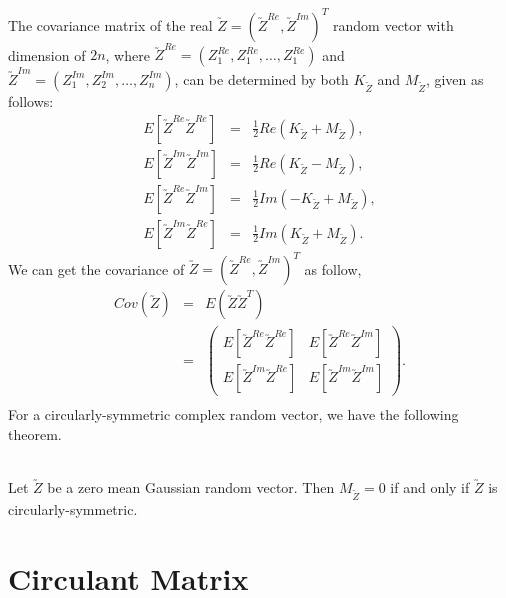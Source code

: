 The covariance matrix of the real $\utilde{Z}=(\utilde{Z}^{Re}, \utilde{Z}^{Im})^T$ random vector with dimension of $2n$, where $\utilde{Z}^{Re} = (Z_1^{Re}, Z_1^{Re}, \ldots, Z_1^{Re})$ and $\utilde{Z}^{Im} =
(Z_1^{Im}, Z_2^{Im}, \ldots, Z_n^{Im})$, can be determined by both $K_{\utilde{Z}}$ and $M_{\utilde{Z}}$, given as follows:
\begin{eqnarray}
	E[\utilde{Z}^{Re}\utilde{Z}^{Re}] &=& \frac{1}{2}Re(K_{\utilde{Z}} + M_{\utilde{Z}}), \nonumber\\
	E[\utilde{Z}^{Im}\utilde{Z}^{Im}] &=& \frac{1}{2}Re(K_{\utilde{Z}} - M_{\utilde{Z}}), \nonumber\\
	E[\utilde{Z}^{Re}\utilde{Z}^{Im}] &=& \frac{1}{2}Im(-K_{\utilde{Z}} + M_{\utilde{Z}}), \nonumber\\
	E[\utilde{Z}^{Im}\utilde{Z}^{Re}] &=& \frac{1}{2}Im(K_{\utilde{Z}} + M_{\utilde{Z}}). \label{comlex_cov}
\end{eqnarray}
We can get the covariance of $\utilde{Z}=(\utilde{Z}^{Re}, \utilde{Z}^{Im})^T$ as follow,
\begin{eqnarray*}
	Cov(\utilde{Z}) &=& E(\utilde{Z}\utilde{Z}^T) \\
	&=& \left( \begin{array}{ll}
	E[\utilde{Z}^{Re}\utilde{Z}^{Re}] &  E[\utilde{Z}^{Re}\utilde{Z}^{Im}] \\
	E[\utilde{Z}^{Im}\utilde{Z}^{Re}] &  E[\utilde{Z}^{Im}\utilde{Z}^{Im}]
	\end{array}
	\right). \\
\end{eqnarray*}
For a circularly-symmetric complex random vector, we have the following theorem.
\begin{theorem} \label{circular_theory} \hfill \\
	Let $\utilde{Z}$ be a zero mean Gaussian random vector. Then $M_{\utilde{Z}}=0$ if and only if $\utilde{Z}$ is circularly-symmetric.
\end{theorem}

\section{Circulant Matrix} \label{circulant}

